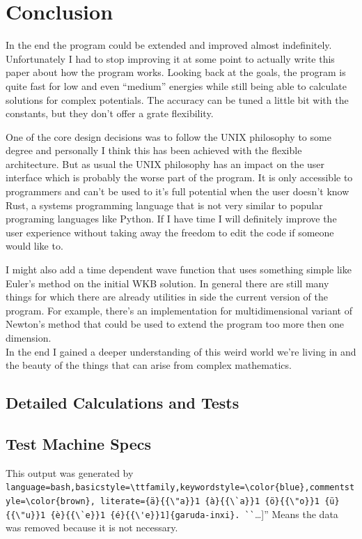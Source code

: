 \documentclass[11pt,DIV=10,final]{scrreprt} %
\providecommand{\bashinline}{\lstinline[language=bash,basicstyle=\ttfamily,keywordstyle=\color{blue},commentstyle=\color{brown}, literate={ä}{{\"a}}1 {à}{{\`a}}1 {ö}{{\"o}}1 {ü}{{\"u}}1 {è}{{\`e}}1 {é}{{\'e}}1]} % für Inline-C++ Code
\begin{document}
{\chapter{Conclusion}
In the end the program could be extended and improved almost indefinitely. Unfortunately I had to stop improving it at some point to actually write this paper about how the program works.
Looking back at the goals, the program is quite fast for low and even ``medium'' energies while still being able to calculate solutions for complex potentials. The accuracy can be tuned a little bit
with the constants, but they don't offer a grate flexibility.

One of the core design decisions was to follow the UNIX philosophy to some degree and personally I think this has been achieved with the flexible architecture. But as usual the UNIX philosophy has an
impact on the user interface which is probably the worse part of the program. It is only accessible to programmers and can't be used to it's full potential when the user doesn't know Rust, a systems
programming language that is not very similar to popular programing languages like Python. If I have time I will definitely improve the user experience without taking away the freedom to edit the code if
someone would like to.

I might also add a time dependent wave function that uses something simple like Euler's method on the initial WKB solution. In general there are still many things for which there are already utilities in
side the current version of the program. For example, there's an implementation for multidimensional variant of Newton's method that could be used to extend the program too more then one dimension.
\\[3ex]
In the end I gained a deeper understanding of this weird world we're living in and the beauty of the things that can arise from complex mathematics.

\begin{appendix} %
%

\chapter{Detailed Calculations and Tests}
\section{Test Machine Specs}
This output was generated by \bashinline{garuda-inxi}. ``[\dots]'' Means the data was removed because it is not necessary.


\end{appendix}}
\end{document}
